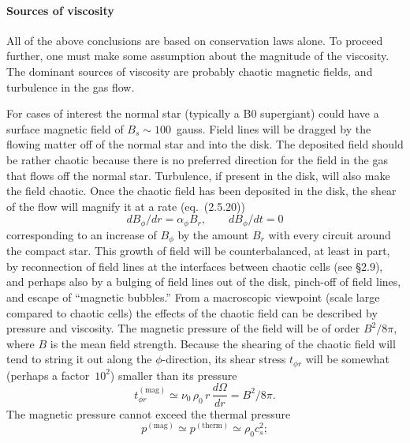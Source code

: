\paragraph*{Sources of viscosity}

All of the above conclusions are based on conservation laws alone. To proceed
further, one must make some assumption about the magnitude of the viscosity.
The dominant sources of viscosity are probably chaotic magnetic fields, and
turbulence in the gas flow.

For cases of interest the normal star (typically a B0 supergiant) could
have a surface magnetic field of $B_s \sim 100$~gauss. Field lines will be dragged
by the flowing matter off of the normal star and into the disk. The deposited field
should be rather chaotic because there is no preferred direction for the field
in the gas that flows off the normal star. Turbulence, if present in the disk,
will also make the field chaotic. Once the chaotic field has been deposited in
the disk, the shear of the flow will magnify it at a rate (eq.~(2.5.20))
\begin{equation}
dB_\phi/dr = \alpha_\phi B_r,\qquad dB_\phi/dt = 0
\tag{5.2.26}
\end{equation}
corresponding to an increase of $B_\phi$ by the amount $B_r$ with every circuit around
the compact star. This growth of field will be counterbalanced, at least in part,
by reconnection of field lines at the interfaces between chaotic cells (see \S2.9),
and perhaps also by a bulging of field lines out of the disk, pinch-off of field
lines, and escape of ``magnetic bubbles.'' From a macroscopic viewpoint (scale
large compared to chaotic cells) the effects of the chaotic field can be described by
pressure and viscosity. The magnetic pressure of the field will be of order $B^2/8\pi$, where $B$
is the mean field strength. Because the shearing of the chaotic field will tend to
string it out along the $\phi$-direction, its shear stress $t_{\phi r}$ will be somewhat (perhaps
a factor~$10^2$) smaller than its pressure
\begin{equation}
t_{\phi r}^{(\text{mag})} \simeq \nu_0\,\rho_0\,r\,\frac{d\Omega}{dr}
= B^2/8\pi.
\tag{5.2.27}
\end{equation}
The magnetic pressure cannot exceed the thermal pressure
\begin{equation}
p^{(\text{mag})} \simeq p^{(\text{therm})} \simeq \rho_0 c_s^2;
\tag{5.2.28}
\end{equation}


